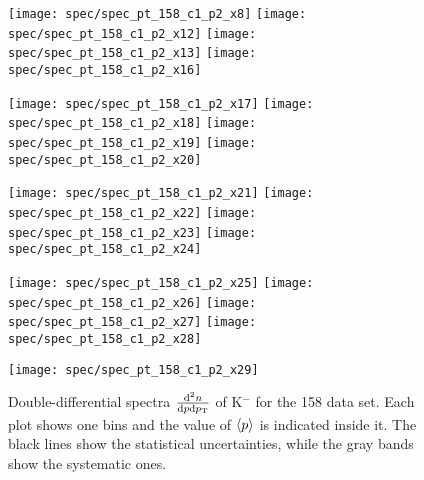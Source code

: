 \begin{figure}[!ht]
  \centering

  \texttt{[image: spec/spec\_pt\_158\_c1\_p2\_x8]}
  \texttt{[image: spec/spec\_pt\_158\_c1\_p2\_x12]}
  \texttt{[image: spec/spec\_pt\_158\_c1\_p2\_x13]}
  \texttt{[image: spec/spec\_pt\_158\_c1\_p2\_x16]}
  
  \texttt{[image: spec/spec\_pt\_158\_c1\_p2\_x17]}
  \texttt{[image: spec/spec\_pt\_158\_c1\_p2\_x18]}
  \texttt{[image: spec/spec\_pt\_158\_c1\_p2\_x19]}
  \texttt{[image: spec/spec\_pt\_158\_c1\_p2\_x20]}

  \texttt{[image: spec/spec\_pt\_158\_c1\_p2\_x21]}
  \texttt{[image: spec/spec\_pt\_158\_c1\_p2\_x22]}
  \texttt{[image: spec/spec\_pt\_158\_c1\_p2\_x23]}
  \texttt{[image: spec/spec\_pt\_158\_c1\_p2\_x24]}

  \texttt{[image: spec/spec\_pt\_158\_c1\_p2\_x25]}
  \texttt{[image: spec/spec\_pt\_158\_c1\_p2\_x26]}
  \texttt{[image: spec/spec\_pt\_158\_c1\_p2\_x27]}
  \texttt{[image: spec/spec\_pt\_158\_c1\_p2\_x28]}

  \texttt{[image: spec/spec\_pt\_158\_c1\_p2\_x29]}

  \caption{Double-differential spectra $\frac{\text{d}^2n}{\text{d}p\text{d}p_\text{T}}$
    of K$^-$ for the 158 \GeVc data set. Each plot shows one \pp bins and the value
    of $\langle p\rangle$ is indicated inside it. The black lines show the statistical
    uncertainties, while the gray bands show the systematic ones.}
  \label{fig:hadron:spec:dedx:all158:c1p2}
\end{figure}

